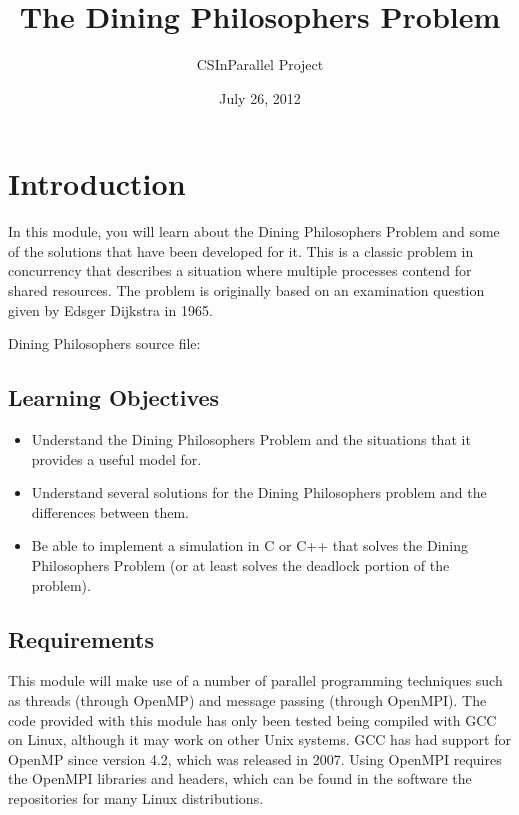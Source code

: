 \documentclass[letterpaper,10pt,openany,oneside]{sphinxmanual}
\title{The Dining Philosophers Problem}
\date{July 26, 2012}
\author{CSInParallel Project}
\begin{document}
\maketitle
\tableofcontents
{}\label{index::doc}



\chapter{Introduction}
\label{Introduction/Introduction:introduction}\label{Introduction/Introduction:the-dining-philosophers-problem}\label{Introduction/Introduction::doc}
In this module, you will learn about the Dining Philosophers
Problem and some of the solutions that have been developed for it.
This is a classic problem in concurrency that describes a situation
where multiple processes contend for shared resources. The problem
is originally based on an examination question given by Edsger
Dijkstra in 1965.

Dining Philosophers source file:


\section{Learning Objectives}
\label{Introduction/Introduction:learning-objectives}\begin{itemize}
\item {} 
Understand the Dining Philosophers Problem and the situations
that it provides a useful model for.

\item {} 
Understand several solutions for the Dining Philosophers problem
and the differences between them.

\item {} 
Be able to implement a simulation in C or C++ that solves the
Dining Philosophers Problem (or at least solves the deadlock
portion of the problem).

\end{itemize}


\section{Requirements}
\label{Introduction/Introduction:requirements}
This module will make use of a number of parallel programming
techniques such as threads (through OpenMP) and message passing
(through OpenMPI). The code provided with this module has only been
tested being compiled with GCC on Linux, although it may work on
other Unix systems. GCC has had support for OpenMP since version
4.2, which was released in 2007. Using OpenMPI requires the OpenMPI
libraries and headers, which can be found in the software the
repositories for many Linux distributions.
\end{document}
